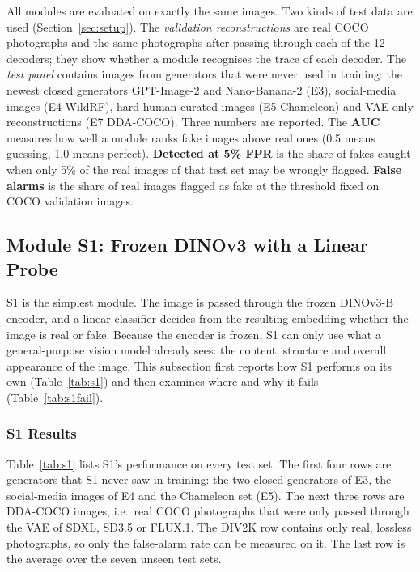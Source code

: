 All modules are evaluated on exactly the same images. Two kinds of test data are used (Section~\ref{sec:setup}). The \textit{validation reconstructions} are real COCO photographs and the same photographs after passing through each of the 12 decoders; they show whether a module recognises the trace of each decoder. The \textit{test panel} contains images from generators that were never used in training: the newest closed generators GPT-Image-2 and Nano-Banana-2 (E3), social-media images (E4 WildRF), hard human-curated images (E5 Chameleon) and VAE-only reconstructions (E7 DDA-COCO). Three numbers are reported. The \textbf{AUC} measures how well a module ranks fake images above real ones (0.5 means guessing, 1.0 means perfect). \textbf{Detected at 5\% FPR} is the share of fakes caught when only 5\% of the real images of that test set may be wrongly flagged. \textbf{False alarms} is the share of real images flagged as fake at the threshold fixed on COCO validation images.

\subsection{Module S1: Frozen DINOv3 with a Linear Probe}
\label{sec:res_s1}

S1 is the simplest module. The image is passed through the frozen DINOv3-B encoder, and a linear classifier decides from the resulting embedding whether the image is real or fake. Because the encoder is frozen, S1 can only use what a general-purpose vision model already sees: the content, structure and overall appearance of the image. This subsection first reports how S1 performs on its own (Table~\ref{tab:s1}) and then examines where and why it fails (Table~\ref{tab:s1fail}).

\subsubsection{S1 Results}

Table~\ref{tab:s1} lists S1's performance on every test set. The first four rows are generators that S1 never saw in training: the two closed generators of E3, the social-media images of E4 and the Chameleon set (E5). The next three rows are DDA-COCO images, i.e.\ real COCO photographs that were only passed through the VAE of SDXL, SD3.5 or FLUX.1. The DIV2K row contains only real, lossless photographs, so only the false-alarm rate can be measured on it. The last row is the average over the seven unseen test sets.

